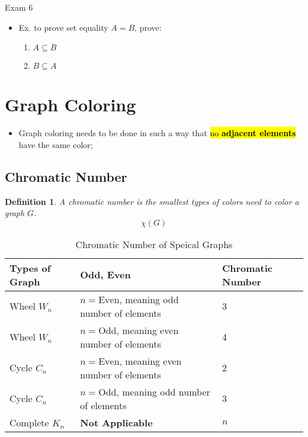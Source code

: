 \documentclass{note}
\newtheorem{definition}{Definition}
\begin{document}
\begin{note}{Exam 6}
\begin{itemize}
\begin{itemize}
                \item Ex. to prove set equality $ A = B $, prove:
                \begin{enumerate}
                    \item $ A \subseteq B $
                    \item $ B \subseteq A $
                \end{enumerate}
            \end{itemize}
        \end{itemize}

        \section{Graph Coloring}

        \begin{itemize}
            \item Graph coloring needs to be done in such a way that \hl{no \textbf{adjacent elements}} have the same color;
        \end{itemize}

        \subsection{Chromatic Number}

        \begin{definition}
            A chromatic number is the smallest types of colors need to color a graph $ G $.
            \begin{displaymath}
                \chi \left(G\right)
            \end{displaymath}
        \end{definition}

        \begin{longtabu} to \textwidth{| X[l, 1] | X[l, 3] | X[l, 2] |}
            \caption{Chromatic Number of Speical Graphs}\\
            \hline
            \textbf{Types of Graph} & \textbf{Odd, Even} & \textbf{Chromatic Number}\\
            \hline \hline
            Wheel $ W_{n} $ & $ n = \text{Even} $, meaning odd number of elements & 3 \\
            \hline
            Wheel $ W_{n} $ & $ n = \text{Odd} $, meaning even number of elements & 4 \\
            \hline \hline
            Cycle $ C_{n} $ & $ n = \text{Even} $, meaning even number of elements & 2 \\
            \hline
            Cycle $ C_{n} $ & $ n = \text{Odd} $, meaning odd number of elements & 3 \\
            \hline \hline
            Complete $ K_{n} $ & \textbf{Not Applicable} & $ n $ \\
            \hline
        \end{longtabu}

    \end{note}
\end{document}
